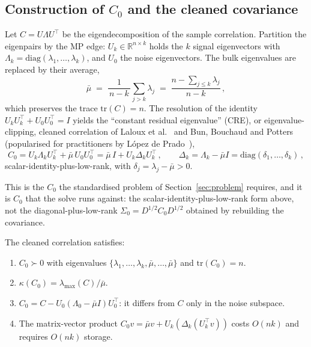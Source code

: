 \subsection{Construction of \texorpdfstring{$C_0$}{C0} and the cleaned covariance}

Let $C = U\Lambda U^\top$ be the eigendecomposition of the sample correlation.
Partition the eigenpairs by the MP edge: $U_k \in \mathbb{R}^{n \times k}$ holds
the $k$ signal eigenvectors with $\Lambda_k = \mathrm{diag}(\lambda_1,\ldots,\lambda_k)$,
and $U_0$ the noise eigenvectors. The bulk eigenvalues are replaced by their
average,
\[
  \bar\mu
  \;=\; \frac{1}{\,n-k\,}\sum_{j > k} \lambda_j
  \;=\; \frac{n - \sum_{j \leq k}\lambda_j}{n-k}\,,
\]
which preserves the trace $\mathrm{tr}(C) = n$. The resolution of the identity
$U_kU_k^\top + U_0U_0^\top = I$ yields the ``constant residual eigenvalue'' (CRE),
or eigenvalue-clipping, cleaned correlation of Laloux et
al.~\cite{laloux1999} and Bun, Bouchaud and Potters~\cite{bun2017} (popularised
for practitioners by L\'opez de Prado~\cite{lopezdeprado2018}),
\[
  C_0
  = U_k \Lambda_k U_k^\top + \bar\mu\, U_0 U_0^\top
  = \bar\mu\, I + U_k \Delta_k U_k^\top\,,
  \qquad
  \Delta_k = \Lambda_k - \bar\mu I = \mathrm{diag}(\delta_1,\ldots,\delta_k)\,,
\]
scalar-identity-plus-low-rank, with $\delta_j = \lambda_j - \bar\mu > 0$.

This is the $C_0$ the standardised problem of Section~\ref{sec:problem} requires,
and it is $C_0$ that the solve runs against: the scalar-identity-plus-low-rank
form above, not the diagonal-plus-low-rank $\Sigma_0 = D^{1/2}C_0D^{1/2}$
obtained by rebuilding the covariance.

\begin{proposition}\label{prop:rmt_spectrum}
The cleaned correlation satisfies:
\begin{enumerate}
  \item $C_0 \succ 0$ with eigenvalues
        $\{\lambda_1, \ldots, \lambda_k, \bar\mu, \ldots, \bar\mu\}$
        and $\mathrm{tr}(C_0) = n$.
  \item $\kappa(C_0) = \lambda_{\max}(C) / \bar\mu$.
  \item $C_0 = C - U_0(\Lambda_0 - \bar\mu I)U_0^\top$: it differs from $C$ only in
        the noise subspace.
  \item The matrix-vector product $C_0 v = \bar\mu v + U_k(\Delta_k(U_k^\top v))$
        costs $O(nk)$ and requires $O(nk)$ storage.
\end{enumerate}
\end{proposition}

